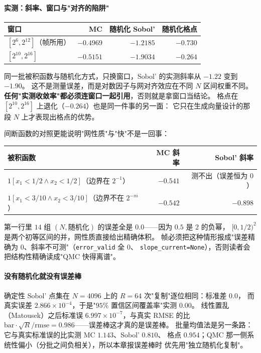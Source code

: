 \paragraph{实测：斜率、窗口与"对齐的陷阱"}
\begin{center}
\begin{tabular}{lrrr}
\hline
窗口 & MC & 随机化 Sobol' & 随机化格点 \\
\hline
$[2^{6},2^{12}]$（帧所用） & $-0.4969$ & $-1.2185$ & $-0.730$ \\
$[2^{10},2^{16}]$ & $-0.5151$ & $-1.9034$ & $-0.264$ \\
\hline
\end{tabular}
\end{center}
同一批被积函数与随机化方式，只换窗口，Sobol' 的实测斜率从 $-1.22$ 变到 $-1.90$。
这不是测量误差，而是对数因子与网对齐效应在不同 $N$ 区间权重不同。
\textbf{任何"实测收敛率"都必须连窗口一起引用}，否则就是拿窗口当结论。
格点在 $[2^{10},2^{16}]$ 上退化（$-0.264$）也是同一件事的另一面：
它只在生成向量设计的那段 $N$ 上才表现出格点的优势。

间断函数的对照更能说明"网性质"与"快"不是一回事：

\begin{center}
\begin{tabular}{lrr}
\hline
被积函数 & MC 斜率 & Sobol' 斜率 \\
\hline
$1[x_1<1/2\wedge x_2<1/2]$（边界在 $2^{-1}$） & $-0.541$ & 测不出（误差恒为 $0$）\\
$1[x_1<3/10\wedge x_2<3/10]$（边界不在 $2^{-m}$） & $-0.542$ & $-0.898$ \\
\hline
\end{tabular}
\end{center}

第一行里 $14$ 组 $(N,\text{随机化})$ 的误差全是 $0.0$——因为 $0.5$ 是 $2$ 的负幂，
$[0,1/2)^2$ 是两个初等区间的并，网性质直接给出精确体积。
帧必须把这种情形报成"误差精确为 $0$、斜率不可测"（\texttt{error\_valid} 全 $0$、
\texttt{slope\_current=None}），否则读者会把结构性精确读成"QMC 快得离谱"。

\paragraph{没有随机化就没有误差棒}
确定性 Sobol' 点集在 $N=4096$ 上的 $R=64$ 次"复制"逐位相同：标准差 $0.0$，
而真实误差 $2.866\times10^{-4}$，于是"$95\%$ 置信区间覆盖率"实测 $0.00$。
线性置乱（Matousek）之后标准误 $6.997\times10^{-7}$，与真实 RMSE 的比
$\text{bar}\cdot\sqrt R/\text{rmse}=0.986$——误差棒这才真的是误差棒。
批量均值法是另一条路：它与真实标准误的比实测 MC $1.143$、Sobol' $0.810$、
格点 $0.954$；QMC 那一侧系统性偏小（分批之间负相关），所以本章报误差棒时
优先用"独立随机化复制"。

